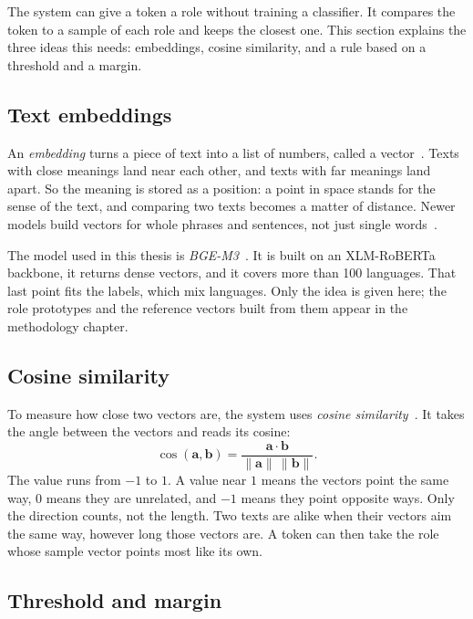 The system can give a token a role without training a classifier. It compares the
token to a sample of each role and keeps the closest one. This section explains the
three ideas this needs: embeddings, cosine similarity, and a rule based on a
threshold and a margin.

\subsection{Text embeddings}\label{sec:bgd-embeddings-vec}

An \emph{embedding} turns a piece of text into a list of numbers, called a
vector~\cite{mikolov2013word2vec}. Texts with close meanings land near each other,
and texts with far meanings land apart. So the meaning is stored as a position: a
point in space stands for the sense of the text, and comparing two texts becomes a
matter of distance. Newer models build vectors for whole phrases and sentences, not
just single words~\cite{reimers2019sbert}.

The model used in this thesis is \emph{BGE-M3}~\cite{chen2024bgem3}. It is built on
an XLM-RoBERTa backbone, it returns dense vectors, and it covers more than 100
languages. That last point fits the labels, which mix languages. Only the idea is
given here; the role prototypes and the reference vectors built from them appear in
the methodology chapter.

\subsection{Cosine similarity}\label{sec:bgd-embeddings-cos}

To measure how close two vectors are, the system uses \emph{cosine
similarity}~\cite{manning2008ir}. It takes the angle between the vectors and reads
its cosine:
\[
  \cos(\mathbf{a},\mathbf{b}) = \frac{\mathbf{a}\cdot\mathbf{b}}{\|\mathbf{a}\|\,\|\mathbf{b}\|}.
\]
The value runs from $-1$ to $1$. A value near $1$ means the vectors point the same
way, $0$ means they are unrelated, and $-1$ means they point opposite ways. Only the
direction counts, not the length. Two texts are alike when their vectors aim the
same way, however long those vectors are. A token can then take the role whose
sample vector points most like its own.

\subsection{Threshold and margin}\label{sec:bgd-embeddings-thresh}

